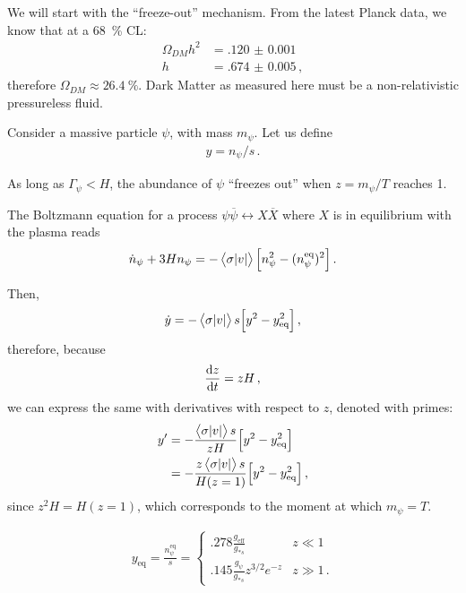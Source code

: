 \documentclass[main.tex]{subfiles}
\begin{document}
We will start with the ``freeze-out'' mechanism. 
From the latest Planck data, we know that at a \SI{68}{\percent} CL:
%
\begin{align}
\Omega_{DM} h^2 &= \num{.120(1)}   \\
h &= \num{.674(5)}
\,,
\end{align}
%
therefore \(\Omega_{DM} \approx \SI{26.4}{\percent}\).
Dark Matter as measured here must be a non-relativistic pressureless fluid.

Consider a massive particle \(\psi \), with mass \(m_\psi \). 
Let us define 
%
\begin{align}
y = n_\psi / s
\,.
\end{align}

As long as \(\Gamma _\psi < H\), the abundance of \(\psi \) ``freezes out'' when \(z = m_\psi / T \) reaches 1. 

The Boltzmann equation for a process \(\psi \overline{\psi} \leftrightarrow X \overline{X}\) where \(X\) is in equilibrium with the plasma reads 
%
\begin{align}
\dot{n}_\psi + 3 H n_\psi = - \expval{\sigma \abs{v}} \qty[n_\psi^2 - (n_\psi^{\text{eq}})^2]
\,.
\end{align}

Then, 
%
\begin{align}
\dot{y} = - \expval{\sigma \abs{v}} s \qty[y^2 - y^2 _{\text{eq}}]
\,,
\end{align}
%
therefore, because
%
\begin{align}
\dv{z}{t} = zH
\,,
\end{align}
%
we can express the same with derivatives with respect to \(z\), denoted with primes: 
%
\begin{align}
y' &= - \frac{\expval{\sigma \abs{v}} s}{z H} \qty[y^2 - y^2 _{\text{eq}}]  \\
&= - \frac{z\expval{\sigma \abs{v}} s}{H(z=1)} \qty[y^2 - y^2 _{\text{eq}}]
\,,
\end{align}
%
since \(z^2 H = H(z=1)\), which corresponds to the moment at which \(m_\psi = T\).


%
\begin{align} \label{eq:y-eq-freezeout}
y _{\text{eq}} = \frac{n_\psi^{\text{eq}}}{s} = \begin{cases}
    \num{.278} \frac{g _{\text{eff}}}{g_{*s}} & z \ll 1  \\
    \num{.145} \frac{g_\psi }{g_{*s}} z^{3/2} e^{-z} & z \gg 1
\,.
\end{cases}
\end{align}
\end{document}
